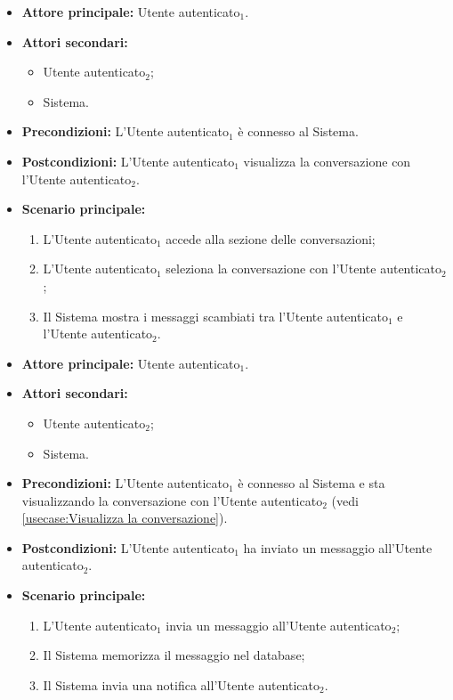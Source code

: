 \label{usecase:Visualizza la conversazione}
\begin{itemize}
	\item \textbf{Attore principale:} Utente autenticato$_1$.
	\item \textbf{Attori secondari:}
	      \begin{itemize}
		      \item Utente autenticato$_2$;
		      \item Sistema.
	      \end{itemize}
	\item \textbf{Precondizioni:} L'Utente autenticato$_1$ è connesso al
	      Sistema.
	\item \textbf{Postcondizioni:} L'Utente autenticato$_1$ visualizza la conversazione
	      con l'Utente autenticato$_2$.

	\item \textbf{Scenario principale:}
	      \begin{enumerate}
		      \item L'Utente autenticato$_1$ accede alla sezione delle conversazioni;
		      \item L'Utente autenticato$_1$ seleziona la conversazione con l'Utente
		            autenticato$_2$;
		      \item Il Sistema mostra i messaggi scambiati tra l'Utente
		            autenticato$_1$ e l'Utente autenticato$_2$.
	      \end{enumerate}
\end{itemize}

\label{usecase:Invia un messaggio}
\begin{itemize}
	\item \textbf{Attore principale:} Utente autenticato$_1$.
	\item \textbf{Attori secondari:}
	      \begin{itemize}
		      \item Utente autenticato$_2$;
		      \item Sistema.
	      \end{itemize}
	\item \textbf{Precondizioni:} L'Utente autenticato$_1$ è connesso al
	      Sistema e sta visualizzando la conversazione con l'Utente autenticato$_2$ (vedi
	      \autoref{usecase:Visualizza la conversazione}).

	\item \textbf{Postcondizioni:} L'Utente autenticato$_1$ ha inviato un
	      messaggio all'Utente autenticato$_2$.
	\item \textbf{Scenario principale:}
	      \begin{enumerate}
		      \item L'Utente autenticato$_1$ invia un messaggio all'Utente
		            autenticato$_2$;
		      \item Il Sistema memorizza il messaggio nel database;
		      \item Il Sistema invia una notifica all'Utente autenticato$_2$.
	      \end{enumerate}
\end{itemize}

